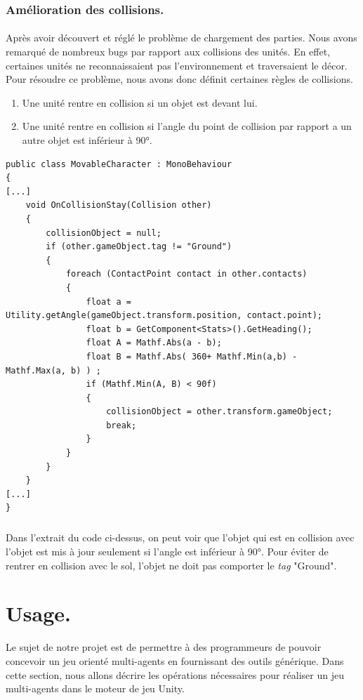 \documentclass{report}
\begin{document}
\subsubsection{Amélioration des collisions.}
\paragraph{} Après avoir découvert et réglé le problème de chargement des parties. Nous avons remarqué de nombreux bugs par rapport aux collisions des unités. En effet, certaines unités ne reconnaissaient pas l'environnement et traversaient le décor. Pour résoudre ce problème, nous avons donc définit certaines règles de collisions.
\begin{enumerate}
\item Une unité rentre en collision si un objet est devant lui. 
\item Une unité rentre en collision si l'angle du point de collision par rapport a un autre objet est inférieur à 90°.
\end{enumerate}

 \begin{lstlisting}[language={[Sharp]C},label={lst:MovableCharacterCollisionScript}, caption= Extrait du code de MovableCharacter.cs]
public class MovableCharacter : MonoBehaviour
{
[...]
    void OnCollisionStay(Collision other)
    {
        collisionObject = null;
        if (other.gameObject.tag != "Ground")
        {
            foreach (ContactPoint contact in other.contacts)
            {
                float a = Utility.getAngle(gameObject.transform.position, contact.point);
                float b = GetComponent<Stats>().GetHeading();
                float A = Mathf.Abs(a - b);
                float B = Mathf.Abs( 360+ Mathf.Min(a,b) - Mathf.Max(a, b) ) ;
                if (Mathf.Min(A, B) < 90f)
                {
                    collisionObject = other.transform.gameObject;
                    break;
                }
            }
        }
    }
[...]
}
\end{lstlisting}
\subparagraph{} Dans l'extrait du code ci-dessus, on peut voir que l'objet qui est en collision avec l'objet est mis à jour seulement si l'angle est inférieur à 90°. Pour éviter de rentrer en collision avec le sol, l'objet ne doit pas comporter le \textit{tag} "Ground".



\section{Usage.}
Le sujet de notre projet est de permettre à des programmeurs de pouvoir concevoir un jeu orienté multi-agents en fournissant des outils générique. Dans cette section, nous allons décrire les opérations nécessaires pour réaliser un jeu multi-agents dans le moteur de jeu Unity.
\end{document}
